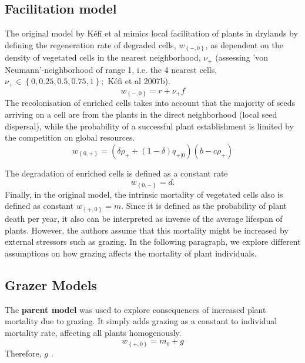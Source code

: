 \subsection{Facilitation model}
The original model by K\'efi et al mimics local facilitation of plants in drylands by defining the regeneration rate of degraded cells, $w_{ \left\{-,0 \right\} }$, as dependent on the density of vegetated cells in the nearest neighborhood, $\nu_+$ (assessing 'von Neumann'-neighborhood of range 1, i.e. the 4 nearest cells, $\nu_+ \in \left\{ 0, 0.25, 0.5, 0.75, 1 \right\}; $ K\'efi et al 2007b).
\begin{equation}
	w_{ \left\{-,0 \right\} } = r + \nu_{+} f
\end{equation}
The recolonisation of enriched cells takes into account that the majority of seeds arriving on a cell are from the plants in the direct neighborhood (local seed dispersal), while the probability of a successful plant establishment is limited by the competition on global resources.
\begin{equation}
	w_{ \left\{0,+ \right\} } = \left( \delta\rho_+ + \left( 1 - \delta \right)q_{+|0}\right) \left(b-c\rho_+ \right)
\end{equation}

The degradation of enriched cells is defined as a constant rate	
\begin{equation}
w_{ \left\{0,- \right\} } = d.
\label{eq:}
\end{equation}
Finally, in the original model, the intrinsic mortality of vegetated cells also is defined as constant $w_{ \left\{+,0 \right\} } = m$. Since it is defined as the probability of plant death per year, it also can be interpreted as inverse of the average lifespan of plants. However, the authors assume that this mortality might be increased by external stressors such as grazing. In the following paragraph, we explore different assumptions on how grazing affects the mortality of plant individuals.

\subsection{Grazer Models}
The \textbf{parent model} was used to explore consequences of increased plant mortality due to grazing. It simply adds grazing as a constant to individual mortality rate, affecting all plants homogenously.
\begin{equation}
	w_{ \left\{ +,0 \right\} }  = m_0 + g
\end{equation}
Therefore, $g$ . 

